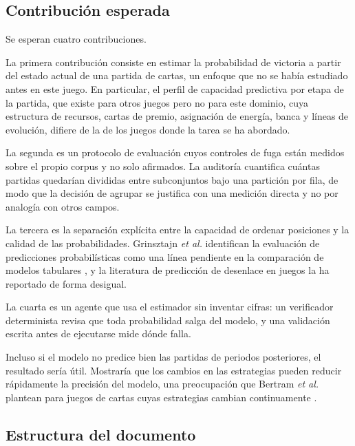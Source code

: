 \subsection{Contribución esperada}
\label{subsec:contribucion}

Se esperan cuatro contribuciones.

La primera contribución consiste en estimar la probabilidad de victoria a 
partir del estado actual de una partida de cartas, un enfoque que no se 
había estudiado antes en este juego. En particular, el perfil de capacidad 
predictiva por etapa de la
partida, que existe para otros juegos pero no para este dominio, cuya
estructura de recursos, cartas de premio, asignación de energía, banca y
líneas de evolución, difiere de la de los juegos donde la tarea se ha
abordado.

La segunda es un protocolo de evaluación cuyos controles de fuga están
medidos sobre el propio corpus y no solo afirmados. La auditoría cuantifica
cuántas partidas quedarían divididas entre subconjuntos bajo una partición
por fila, de modo que la decisión de agrupar se justifica con una medición
directa y no por analogía con otros campos.

La tercera es la separación explícita entre la capacidad de ordenar
posiciones y la calidad de las probabilidades. Grinsztajn \textit{et al.}
identifican la evaluación de predicciones probabilísticas como una línea
pendiente en la comparación de modelos tabulares
\cite{grinsztajn_trees_2022}, y la literatura de predicción de desenlace en
juegos la ha reportado de forma desigual.

La cuarta es un agente que usa el estimador sin inventar cifras: un
verificador determinista revisa que toda probabilidad salga del modelo, y
una validación escrita antes de ejecutarse mide dónde falla.

Incluso si el modelo no predice bien las partidas de periodos posteriores,
el resultado sería útil. Mostraría que los cambios en las estrategias pueden
reducir rápidamente la precisión del modelo, una preocupación que Bertram
\textit{et al.} plantean para juegos de cartas cuyas estrategias cambian
continuamente \cite{bertram_cardrepresentations_2024}.

\subsection{Estructura del documento}
\label{subsec:estructura}

